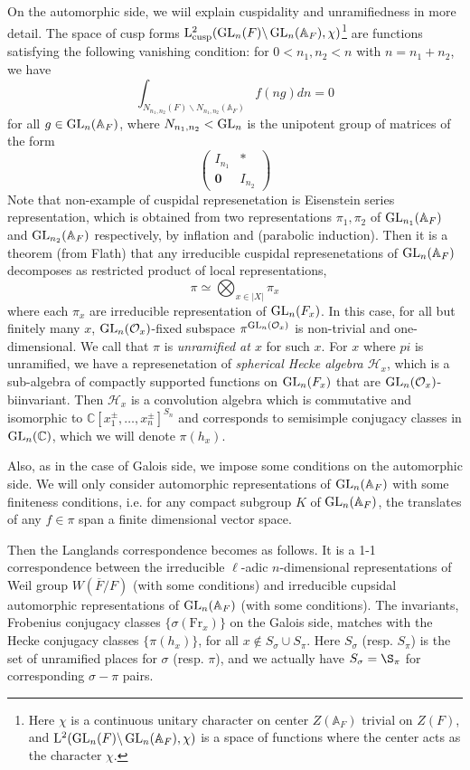 On the automorphic side, we wiil explain cuspidality and unramifiedness in more detail.
The space of cusp forms $\mathrm{L}^{2}_{\operatorname{\mathrm{cusp}}}(\operatorname{\mathrm{GL}}_{n}(F) \backslash \operatorname{\mathrm{GL}}_{n}(\mathbb{A}_{F}), \chi)$\footnote{Here $\chi$ is a continuous unitary character on center $Z(\mathbb{A}_{F})$ trivial on $Z(F)$,
and $\mathrm{L}^{2}(\operatorname{\mathrm{GL}}_{n}(F)\backslash\operatorname{\mathrm{GL}}_{n}(\mathbb{A}_{F}), \chi)$ is a space of functions where the center acts as the character $\chi$.
}
are functions satisfying the following vanishing condition: for $0 < n_{1}, n_{2} < n$ with $n = n_{1} + n_{2}$,
we have
$$
\int_{N_{n_{1}, n_{2}}(F) \backslash N_{n_{1}, n_{2}}(\mathbb{A}_{F})} f(ng)dn = 0
$$
for all $g\in \operatorname{\mathrm{GL}}_{n}(\mathbb{A}_{F})$, where $N_{n_{1}, n_{2}} < \operatorname{\mathrm{GL}}_{n}$ is the unipotent group of matrices of the form
$$
\begin{pmatrix}
    I_{n_{1}} & * \\ \mathbf{0} & I_{n_2}
\end{pmatrix}
$$
Note that non-example of cuspidal represenetation is Eisenstein series representation, which is obtained from
two representations $\pi_{1}, \pi_{2}$ of $\operatorname{\mathrm{GL}}_{n_{1}}(\mathbb{A}_{F})$ and $\operatorname{\mathrm{GL}}_{n_2}(\mathbb{A}_F)$ respectively, by inflation and (parabolic induction).
Then it is a theorem (from Flath) that any irreducible cuspidal represenetations of $\operatorname{\mathrm{GL}}_{n}(\mathbb{A}_F)$ decomposes as restricted product
of local representations,
$$
\pi \simeq \bigotimes_{x\in |X|} \pi_{x}
$$
where each $\pi_{x}$ are irreducible representation of $\operatorname{\mathrm{GL}}_{n}(F_x)$.
In this case, for all but finitely many $x$, $\operatorname{\mathrm{GL}}_{n}(\mathcal{O}_{x})$-fixed subspace
$\pi^{\operatorname{\mathrm{GL}}_{n}(\mathcal{O}_x)}$ is non-trivial and one-dimensional.
We call that $\pi$ is \emph{unramified at $x$} for such $x$.
For $x$ where $pi$ is unramified, we have a represenetation of \emph{spherical Hecke algebra $\mathcal{H}_{x}$}, which 
is a sub-algebra of compactly supported functions on $\operatorname{\mathrm{GL}}_{n}(F_{x})$ that are $\operatorname{\mathrm{GL}}_{n}(\mathcal{O}_{x})$-biinvariant.
Then $\mathcal{H}_{x}$ is a convolution algebra which is commutative and 
isomorphic to $\mathbb{C}[x_{1}^{\pm}, \dots, x_{n}^{\pm}]^{S_{n}}$
and corresponds to semisimple conjugacy classes in $\operatorname{\mathrm{GL}}_{n}(\mathbb{C})$, which we will denote $\pi(h_{x})$.

Also, as in the case of Galois side, we impose some conditions on the automorphic side.
We will only consider automorphic representations of $\operatorname{\mathrm{GL}}_{n}(\mathbb{A}_{F})$ with some finiteness conditions, i.e.
for any compact subgroup $K$ of $\operatorname{\mathrm{GL}}_{n}(\mathbb{A}_F)$, the translates of any $f\in \pi$ span a
finite dimensional vector space.

Then the Langlands correspondence becomes as follows.
It is a 1-1 correspondence between the irreducible $\ell$-adic $n$-dimensional representations of Weil group $W(\overline{F}/F)$
(with some conditions) and irreducible cupsidal automorphic representations of $\operatorname{\mathrm{GL}}_{n}(\mathbb{A}_{F})$ (with some conditions).
The invariants, Frobenius conjugacy classes $\{\sigma(\mathrm{Fr}_{x})\}$ on the Galois side, matches with
the Hecke conjugacy classes $\{\pi(h_{x})\}$, for all $x \not \in S_{\sigma} \cup S_{\pi}$.
Here $S_{\sigma}$ (resp. $S_{\pi}$) is the set of unramified places for $\sigma$ (resp. $\pi$), and
we actually have $S_{\sigma} = \S_{\pi}$ for corresponding $\sigma - \pi$ pairs.